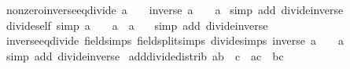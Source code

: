 \begin{isabellebody}
\isanewline
{}\isamarkupfalse%
%
\endisatagproof
{\isafoldproof}%
%
\isadelimproof
\isanewline
%
\endisadelimproof
\isanewline
{}\isamarkupfalse%
\ nonzero{\isacharunderscore}{\kern0pt}inverse{\isacharunderscore}{\kern0pt}eq{\isacharunderscore}{\kern0pt}divide{\isacharcolon}{\kern0pt}\ {\isachardoublequoteopen}a\ {\isasymnoteq}\ {}\ {\isasymLongrightarrow}\ inverse\ a\ {\isacharequal}{\kern0pt}\ {}\ {\isacharslash}{\kern0pt}\ a{\isachardoublequoteclose}\isanewline
%
\isadelimproof
%
\endisadelimproof
%
\isatagproof
{}\isamarkupfalse%
\ {\isacharparenleft}{\kern0pt}simp\ add{\isacharcolon}{\kern0pt}\ divide{\isacharunderscore}{\kern0pt}inverse{\isacharparenright}{\kern0pt}%
\endisatagproof
{\isafoldproof}%
%
\isadelimproof
\isanewline
%
\endisadelimproof
\isanewline
{}\isamarkupfalse%
\ divide{\isacharunderscore}{\kern0pt}self\ {\isacharbrackleft}{\kern0pt}simp{\isacharbrackright}{\kern0pt}{\isacharcolon}{\kern0pt}\ {\isachardoublequoteopen}a\ {\isasymnoteq}\ {}\ {\isasymLongrightarrow}\ a\ {\isacharslash}{\kern0pt}\ a\ {\isacharequal}{\kern0pt}\ {}{\isachardoublequoteclose}\isanewline
%
\isadelimproof
%
\endisadelimproof
%
\isatagproof
{}\isamarkupfalse%
\ {\isacharparenleft}{\kern0pt}simp\ add{\isacharcolon}{\kern0pt}\ divide{\isacharunderscore}{\kern0pt}inverse{\isacharparenright}{\kern0pt}%
\endisatagproof
{\isafoldproof}%
%
\isadelimproof
\isanewline
%
\endisadelimproof
\isanewline
{}\isamarkupfalse%
\ inverse{\isacharunderscore}{\kern0pt}eq{\isacharunderscore}{\kern0pt}divide\ {\isacharbrackleft}{\kern0pt}field{\isacharunderscore}{\kern0pt}simps{\isacharcomma}{\kern0pt}\ field{\isacharunderscore}{\kern0pt}split{\isacharunderscore}{\kern0pt}simps{\isacharcomma}{\kern0pt}\ divide{\isacharunderscore}{\kern0pt}simps{\isacharbrackright}{\kern0pt}{\isacharcolon}{\kern0pt}\ {\isachardoublequoteopen}inverse\ a\ {\isacharequal}{\kern0pt}\ {}\ {\isacharslash}{\kern0pt}\ a{\isachardoublequoteclose}\isanewline
%
\isadelimproof
%
\endisadelimproof
%
\isatagproof
{}\isamarkupfalse%
\ {\isacharparenleft}{\kern0pt}simp\ add{\isacharcolon}{\kern0pt}\ divide{\isacharunderscore}{\kern0pt}inverse{\isacharparenright}{\kern0pt}%
\endisatagproof
{\isafoldproof}%
%
\isadelimproof
\isanewline
%
\endisadelimproof
\isanewline
{}\isamarkupfalse%
\ add{\isacharunderscore}{\kern0pt}divide{\isacharunderscore}{\kern0pt}distrib{\isacharcolon}{\kern0pt}\ {\isachardoublequoteopen}{\isacharparenleft}{\kern0pt}a{\isacharplus}{\kern0pt}b{\isacharparenright}{\kern0pt}\ {\isacharslash}{\kern0pt}\ c\ {\isacharequal}{\kern0pt}\ a{\isacharslash}{\kern0pt}c\ {\isacharplus}{\kern0pt}\ b{\isacharslash}{\kern0pt}c{\isachardoublequoteclose}\isanewline

\end{isabellebody}
